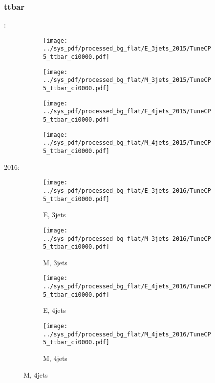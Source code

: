 \documentclass{beamer}
\begin{document}
\begin{frame}
\frametitle{ttbar}
\fontsize{5}{1}:
\begin{figure}
\centering
\begin{subfigure}[b]{0.24\textwidth}
\texttt{[image: ../sys\_pdf/processed\_bg\_flat/E\_3jets\_2015/TuneCP5\_ttbar\_ci0000.pdf]}
\end{subfigure}
\begin{subfigure}[b]{0.24\textwidth}
\texttt{[image: ../sys\_pdf/processed\_bg\_flat/M\_3jets\_2015/TuneCP5\_ttbar\_ci0000.pdf]}
\end{subfigure}
\begin{subfigure}[b]{0.24\textwidth}
\texttt{[image: ../sys\_pdf/processed\_bg\_flat/E\_4jets\_2015/TuneCP5\_ttbar\_ci0000.pdf]}
\end{subfigure}
\begin{subfigure}[b]{0.24\textwidth}
\texttt{[image: ../sys\_pdf/processed\_bg\_flat/M\_4jets\_2015/TuneCP5\_ttbar\_ci0000.pdf]}
\end{subfigure}
\end{figure}
2016:
\begin{figure}
\centering
\begin{subfigure}[b]{0.24\textwidth}
\texttt{[image: ../sys\_pdf/processed\_bg\_flat/E\_3jets\_2016/TuneCP5\_ttbar\_ci0000.pdf]}
\captionsetup{font=tiny}
\caption{E, 3jets}
\end{subfigure}
\begin{subfigure}[b]{0.24\textwidth}
\texttt{[image: ../sys\_pdf/processed\_bg\_flat/M\_3jets\_2016/TuneCP5\_ttbar\_ci0000.pdf]}
\captionsetup{font=tiny}
\caption{M, 3jets}
\end{subfigure}
\begin{subfigure}[b]{0.24\textwidth}
\texttt{[image: ../sys\_pdf/processed\_bg\_flat/E\_4jets\_2016/TuneCP5\_ttbar\_ci0000.pdf]}
\captionsetup{font=tiny}
\caption{E, 4jets}
\end{subfigure}
\begin{subfigure}[b]{0.24\textwidth}
\texttt{[image: ../sys\_pdf/processed\_bg\_flat/M\_4jets\_2016/TuneCP5\_ttbar\_ci0000.pdf]}
\captionsetup{font=tiny}
\caption{M, 4jets}
\end{subfigure}
\end{figure}
\end{frame}
\end{document}
